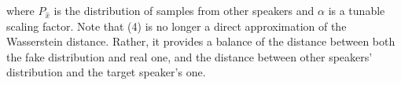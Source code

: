 where $P_{\hat{x}}$ is the distribution of samples from other speakers and
$\alpha$ is a tunable scaling factor. Note that (4) is no longer a direct approximation of the Wasserstein distance. Rather, it provides a balance of the distance between both the fake distribution and real one, and the distance between other speakers' distribution and the target speaker's one.  
